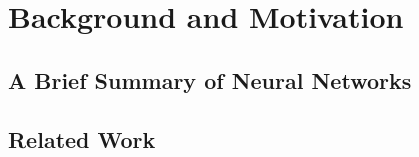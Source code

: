 \chapter{Background and Motivation}
\section{A Brief Summary of Neural Networks}
\section{Related Work}